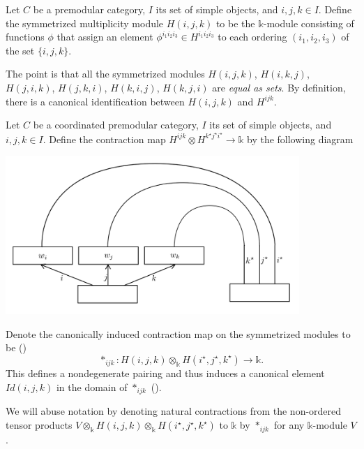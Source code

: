 \begin{definition}\label{def/symmetrized-multiplicity-module}
  Let $C$ be a premodular category, $I$ its set of simple objects, and
  $i, j, k \in I$. Define the symmetrized multiplicity module
  $H(i,j,k)$ to be the $\mathbb{k}$-module consisting of
  functions $\phi$ that assign an element
  $\phi^{i_{1}i_{2}i_{3}} \in H^{i_{1}i_{2}i_{3}}$ to each
  ordering $(i_{1}, i_{2}, i_{3})$ of the set $\{i, j, k\}$.
\end{definition}

\noindent The point is that all the symmetrized modules
$H(i,j,k)$, $H(i,k,j)$, $H(j,i,k)$, $H(j,k,i)$, $H(k,i,j)$,
$H(k,j,i)$ are \textit{equal as sets}. By definition, there is a
canonical identification between $H(i,j,k)$ and $H^{ijk}$.

\begin{definition}[contraction]\label{def/contraction}
  Let $C$ be a coordinated premodular category, $I$ its set of
  simple objects, and $i, j, k \in I$. Define the contraction map
  $H^{ijk} \otimes H^{k^{\star}j^{\star}i^{\star}} \to \mathbb{k}$
  by the following diagram 
  \begin{center}
    \includegraphics[height=6cm]{pairing}
  \end{center}
  Denote the canonically induced contraction map on the
  symmetrized modules to be
  (\cite[p.334]{turaev-qiok-3-manifolds})
  $$\ast_{ijk}: H(i,j,k) \otimes_{\mathbb{k}} H(i^{\star}, j^{\star}, k^{\star}) \to \mathbb{k}.$$
  This defines a nondegenerate pairing and thus induces a
  canonical element $Id(i,j,k)$ in the domain of $\ast_{ijk}$
  (\cite[p.333]{turaev-qiok-3-manifolds}).
\end{definition}

\noindent We will abuse notation by denoting natural contractions
from the non-ordered tensor products
$V \otimes_{\mathbb{k}} H(i,j,k) \otimes_{\mathbb{k}} H(i^{\star}, j^{\star}, k^{\star})$
to $\mathbb{k}$ by $\ast_{ijk}$ for any $\mathbb{k}$-module $V$.

